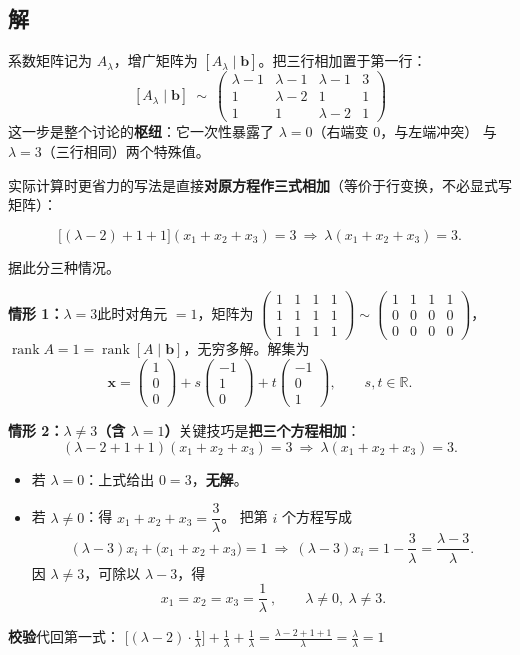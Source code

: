 \documentclass[10pt]{ctexart}
\newcommand{\Rr}{\mathbb{R}}
\newcommand{\rank}{\operatorname{rank}}
\newcommand{\bv}[1]{\begin{pmatrix}#1\end{pmatrix}}
\begin{document}
\subsection*{解}

系数矩阵记为 $A_\lambda$，增广矩阵为 $[A_\lambda\mid\mathbf b]$。把三行相加置于第一行：
\[
[A_\lambda\mid\mathbf b]\ \sim\
\bv{\lambda-1&\lambda-1&\lambda-1&3\\
1&\lambda-2&1&1\\
1&1&\lambda-2&1}
\]
这一步是整个讨论的\textbf{枢纽}：它一次性暴露了 $\lambda=0$（右端变 $0$，与左端冲突）
与 $\lambda=3$（三行相同）两个特殊值。

实际计算时更省力的写法是直接\textbf{对原方程作三式相加}（等价于行变换，不必显式写矩阵）：

$$\big[(\lambda-2)+1+1\big](x_1+x_2+x_3)=3\ \Longrightarrow\ \lambda(x_1+x_2+x_3)=3 .$$

据此分三种情况。

\medskip
\textbf{情形 1：$\lambda=3$}\quad 此时对角元 $=1$，矩阵为 $\bv{1&1&1&1\\1&1&1&1\\1&1&1&1}\sim\bv{1&1&1&1\\0&0&0&0\\0&0&0&0}$，
$\rank A=1=\rank[A\mid\mathbf b]$，无穷多解。解集为
\[
\mathbf x=\bv{1\\0\\0}+s\bv{-1\\1\\0}+t\bv{-1\\0\\1},\qquad s,t\in\Rr .
\]

\textbf{情形 2：$\lambda\neq 3$（含 $\lambda=1$）}\quad 关键技巧是\textbf{把三个方程相加}：
\[
(\lambda-2+1+1)(x_1+x_2+x_3)=3\ \Longrightarrow\ \lambda(x_1+x_2+x_3)=3 .
\]
\begin{itemize}
\item 若 $\lambda=0$：上式给出 $0=3$，\textbf{无解}。
\item 若 $\lambda\neq0$：得 $x_1+x_2+x_3=\dfrac{3}{\lambda}$。
把第 $i$ 个方程写成
\[
(\lambda-3)x_i+\big(x_1+x_2+x_3\big)=1
\ \Longrightarrow\
(\lambda-3)x_i=1-\frac{3}{\lambda}=\frac{\lambda-3}{\lambda}.
\]
因 $\lambda\neq3$，可除以 $\lambda-3$，得
\[
\boxed{\ x_1=x_2=x_3=\frac{1}{\lambda}\ },\qquad \lambda\neq0,\ \lambda\neq3 .
\]
\end{itemize}

\textbf{校验}\quad 代回第一式：
$\big[(\lambda-2)\cdot\frac{1}{\lambda}\big]+\frac{1}{\lambda}+\frac{1}{\lambda}
=\frac{\lambda-2+1+1}{\lambda}=\frac{\lambda}{\lambda}=1$ \checkmark
\end{document}
